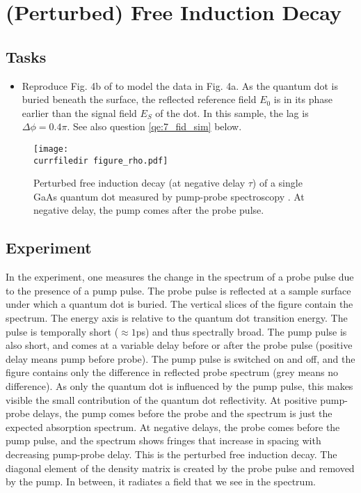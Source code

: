 \renewcommand{\lastmod}{Mai 29, 2024}
\renewcommand{\chapterauthors}{Markus Lippitz}


\chapter{(Perturbed) Free Induction Decay}
\label{chap:fid}


\section{Tasks}

\begin{itemize}
\item Reproduce Fig. 4b of \cite{Wolpert:2012hs} to model the data in Fig. 4a. As the quantum dot is buried beneath the surface, the reflected reference field $E_0$ is in its phase earlier than the signal field $E_S$ of the dot. In this sample, the lag is $\Delta \phi = 0.4 \pi$. See also question \ref{qe:7_fid_sim} below.
\end{itemize}

\begin{figure}
\centering
\texttt{[image: \\currfiledir figure\_rho.pdf]}
\caption{Perturbed free induction decay (at negative delay $\tau$) of a single GaAs quantum dot measured by pump-probe spectroscopy \citep{Wolpert:2012hs}. At negative delay, the pump comes after the probe pulse.} \label{fig:fid_wolpert}
\end{figure}

\section{Experiment}

In the experiment, one measures the change in the spectrum of a probe pulse due to the presence of a pump pulse. The probe pulse is reflected at a sample surface under which a quantum dot is buried. The vertical slices of the figure contain the spectrum. The energy axis is relative to the quantum dot transition energy. The pulse is temporally short ($\approx 1 $ps) and thus spectrally broad. The pump pulse is also short, and comes at a variable delay before or after the probe pulse (positive delay means pump before probe). The pump pulse is switched on and off, and the figure contains only the difference in reflected probe spectrum (grey means no difference). As only the quantum dot is influenced by the pump pulse, this makes visible the small contribution of the quantum dot reflectivity.
At positive pump-probe delays, the pump comes before the probe and the spectrum is just the expected absorption spectrum. At negative delays, the probe comes before the pump pulse, and the spectrum shows fringes that increase in spacing with decreasing pump-probe delay. This is the perturbed free induction decay. The diagonal element of the density matrix is created by the probe pulse and removed by the pump. In between, it radiates a field that we see in the spectrum.

